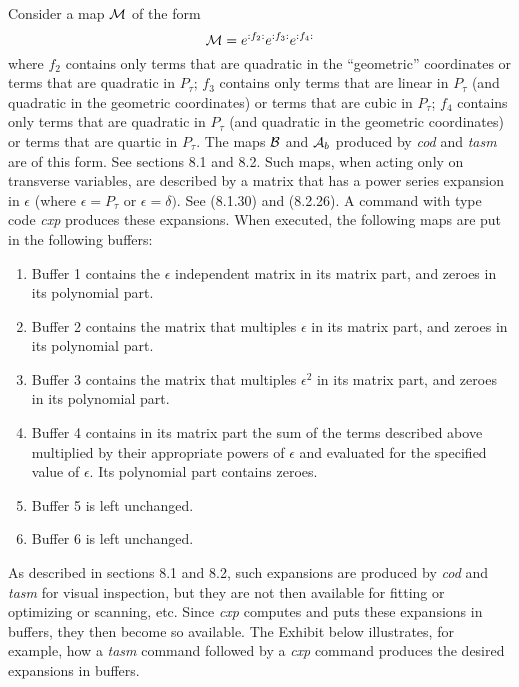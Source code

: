 Consider a map ${\cal M}$ of the form
\begin{equation}
{\cal M}= e^{:f_2:} e^{:f_3:} e^{:f_4:}
\end{equation}
where $f_2$ contains only terms that are quadratic in the ``geometric'' coordinates or terms that are quadratic in $P_\tau$; $f_3$  contains only terms that are linear in $P_\tau$  (and quadratic in the geometric coordinates) or terms that are cubic in $P_\tau$; $f_4$  contains only terms that are quadratic in $P_\tau$  (and quadratic in the geometric coordinates) or terms that are quartic in $P_\tau$.  The maps ${\cal B}$ and ${\cal A}_b$ produced by {\em cod} and {\em tasm} are of this form.  See sections 8.1 and 8.2.  Such maps, when acting only on transverse variables, are described by a matrix that has a power series expansion in $\epsilon$ (where $ \epsilon = P_{\tau}$ or $\epsilon = \delta)$.  See (8.1.30) and (8.2.26).  A command with type code {\em cxp} produces these expansions.  When executed, the following maps are put in the following buffers:
\begin{enumerate}
\item Buffer 1 contains the $\epsilon$ independent matrix in its matrix part, and zeroes in its polynomial part.
\item Buffer 2 contains the matrix that multiples $\epsilon$ in its matrix part, and zeroes in its polynomial part.
\item Buffer 3 contains the matrix that multiples $\epsilon^2$ in its matrix part, and zeroes in its polynomial part.
\item Buffer 4 contains in its matrix part the sum of the terms described above multiplied by their appropriate powers of $\epsilon$ and evaluated for the specified value of $\epsilon$.  Its polynomial part contains zeroes.
\item Buffer 5 is left unchanged.
\item Buffer 6 is left unchanged.
\end{enumerate}

As described in sections 8.1 and 8.2, such expansions are produced by {\em cod} and {\em tasm} for visual inspection, but they are not then available for fitting or optimizing or scanning, etc.  Since {\em cxp} computes and puts these expansions in buffers, they then become so available.  The Exhibit below illustrates, for example, how a {\em tasm} command followed by a {\em cxp} command produces the desired expansions in buffers.

